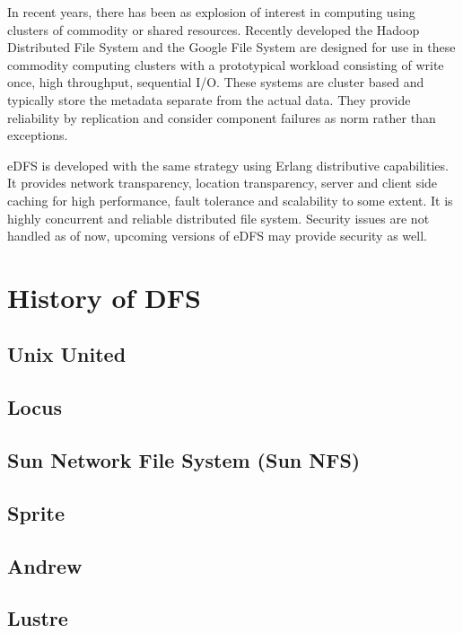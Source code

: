\documentclass[a4paper,12pt]{article}
\begin{document}
In recent years, there has been as explosion of interest in computing using clusters of commodity or shared resources. Recently developed the Hadoop Distributed File System \cite{hadoop} and the Google File System \cite{ghemawat03} are designed for use in these commodity computing clusters with a prototypical workload consisting of write once, high throughput, sequential I/O. These systems are cluster based and typically store the metadata separate from the actual data. They provide reliability by replication and consider component failures as norm rather than exceptions.

eDFS is developed with the same strategy using Erlang distributive capabilities. It provides network transparency, location transparency, server and client side caching for high performance, fault tolerance and scalability to some extent. It is highly concurrent and reliable distributed file system. Security issues are not handled as of now, upcoming versions of eDFS may provide security as well.

\section{History of DFS}
\subsection{Unix United \cite[p.~342]{old_dfs}}


\subsection{Locus \cite[p.~345]{old_dfs}}

\subsection{Sun Network File System (Sun NFS) \cite[p.~351]{old_dfs}}

\subsection{Sprite \cite[p.~357]{old_dfs}}

\subsection{Andrew \cite[p.~360]{old_dfs}}

\subsection{Lustre}
\end{document}
